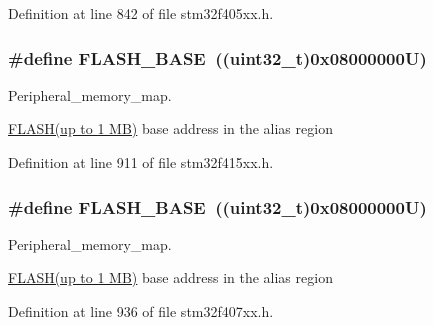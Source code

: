 Definition at line 842 of file stm32f405xx.\+h.

\subsubsection[{\texorpdfstring{F\+L\+A\+S\+H\+\_\+\+B\+A\+SE}{FLASH_BASE}}]{\setlength{\rightskip}{0pt plus 5cm}\#define F\+L\+A\+S\+H\+\_\+\+B\+A\+SE~((uint32\+\_\+t)0x08000000\+U)}\hypertarget{group___peripheral__registers__structures_ga23a9099a5f8fc9c6e253c0eecb2be8db}{}\label{group___peripheral__registers__structures_ga23a9099a5f8fc9c6e253c0eecb2be8db}


Peripheral\+\_\+memory\+\_\+map. 

\hyperlink{group___peripheral__declaration_ga844ea28ba1e0a5a0e497f16b61ea306b}{F\+L\+A\+S\+H(up to 1 M\+B)} base address in the alias region 

Definition at line 911 of file stm32f415xx.\+h.

\subsubsection[{\texorpdfstring{F\+L\+A\+S\+H\+\_\+\+B\+A\+SE}{FLASH_BASE}}]{\setlength{\rightskip}{0pt plus 5cm}\#define F\+L\+A\+S\+H\+\_\+\+B\+A\+SE~((uint32\+\_\+t)0x08000000\+U)}\hypertarget{group___peripheral__registers__structures_ga23a9099a5f8fc9c6e253c0eecb2be8db}{}\label{group___peripheral__registers__structures_ga23a9099a5f8fc9c6e253c0eecb2be8db}


Peripheral\+\_\+memory\+\_\+map. 

\hyperlink{group___peripheral__declaration_ga844ea28ba1e0a5a0e497f16b61ea306b}{F\+L\+A\+S\+H(up to 1 M\+B)} base address in the alias region 

Definition at line 936 of file stm32f407xx.\+h.

